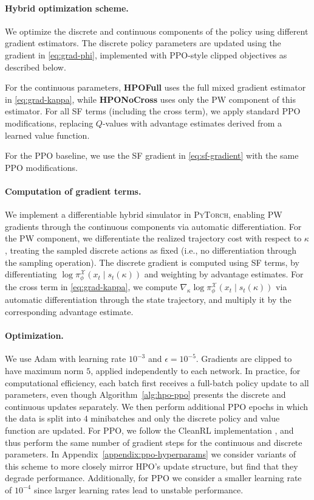 \documentclass{article}
\theoremstyle{definition}
\theoremstyle{remark}
\begin{document}
\paragraph{Hybrid optimization scheme.}
We optimize the discrete and continuous components of the policy using different gradient estimators. 
The discrete policy parameters are updated using the gradient in \eqref{eq:grad-phi}, implemented with PPO-style clipped objectives as described below. 

For the continuous parameters, \textbf{HPOFull} uses the full mixed gradient estimator in \eqref{eq:grad-kappa}, while \textbf{HPONoCross} uses only the PW component of this estimator. 
For all SF terms (including the cross term), we apply standard PPO modifications, replacing $Q$-values with advantage estimates derived from a learned value function. 

For the PPO baseline, we use the SF gradient in \eqref{eq:sf-gradient} with the same PPO modifications.

\paragraph{Computation of gradient terms.}
We implement a differentiable hybrid simulator in \textsc{PyTorch}, enabling PW gradients through the continuous components via automatic differentiation.
For the PW component, we differentiate the realized trajectory cost with respect to $\kappa$, treating the sampled discrete actions as fixed (i.e., no differentiation through the sampling operation). 
The discrete gradient is computed using SF terms, by differentiating $\log \pi^{\mathcal X}_{\phi}(x_t \mid s_t(\kappa))$ and weighting by advantage estimates. 
For the cross term in \eqref{eq:grad-kappa}, we compute $\nabla_\kappa \log \pi^{\mathcal X}_{\phi}(x_t \mid s_t(\kappa))$ via automatic differentiation through the state trajectory, and multiply it by the corresponding advantage estimate.

\paragraph{Optimization.}
We use Adam with learning rate $10^{-3}$ and $\epsilon = 10^{-5}$. 
Gradients are clipped to have maximum norm $5$, applied independently to each network. 
In practice, for computational efficiency, each batch first receives a full-batch policy update to all parameters, even though Algorithm~\ref{alg:hpo-ppo} presents the discrete and continuous updates separately. We then perform additional PPO epochs in which the data is split into $4$ minibatches and only the discrete policy and value function are updated. For PPO, we follow the CleanRL implementation \cite{huang2022cleanrl}, and thus perform the same number of gradient steps for the continuous and discrete parameters. In Appendix~\ref{appendix:ppo-hyperparams} we consider variants of this scheme to more closely mirror HPO's update structure, but find that they degrade performance. Additionally, for PPO we consider a smaller learning rate of $10^{-4}$
since larger learning rates lead to unstable performance.
\end{document}
